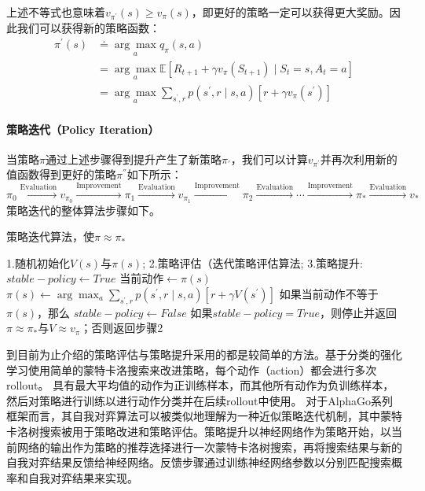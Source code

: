 上述不等式也意味着$v_{\pi^{\prime}}(s) \geq v_{\pi}(s)$，即更好的策略一定可以获得更大奖励。因此我们可以获得新的策略函数：
\begin{equation}
  \begin{aligned}
  \pi^{\prime}(s) & \doteq \underset{a}{\arg \max } q_{\pi}(s, a) \\
  &=\underset{a}{\arg \max } \mathbb{E}\left[R_{t+1}+\gamma v_{\pi}\left(S_{t+1}\right) \mid S_{t}=s, A_{t}=a\right] \\
  &=\underset{a}{\arg \max } \sum_{s^{\prime}, r} p\left(s^{\prime}, r \mid s, a\right)\left[r+\gamma v_{\pi}\left(s^{\prime}\right)\right]
  \end{aligned}
\end{equation}

\paragraph{策略迭代（Policy Iteration）}
当策略$\pi$通过上述步骤得到提升产生了新策略$\pi_{'}$，我们可以计算$v_{\pi^{'}}$并再次利用新的值函数得到更好的策略$\pi^{''}$如下所示：
\begin{equation}
  \pi_{0} \stackrel{\mathrm{Evaluation}}{\longrightarrow} v_{\pi_{0}} \stackrel{\mathrm{Improvement}}{\longrightarrow} \pi_{1} \stackrel{\mathrm{Evaluation}}{\longrightarrow} v_{\pi_{1}} \stackrel{\mathrm{Improvement}}{\longrightarrow} \pi_{2} \stackrel{\mathrm{Evaluation}}{\longrightarrow} \cdots \stackrel{\mathrm{Improvement}}{\longrightarrow} \pi_{*} \stackrel{\mathrm{Evaluation}}{\longrightarrow} v_{*}
\end{equation}
策略迭代的整体算法步骤如下。
\begin{algorithm}[H]
  \caption{策略迭代算法，使$\pi \approx \pi_{*} $}
  \begin{algorithmic}
    \State 1.随机初始化$V(s)$与$\pi(s)$;
    \State 2.策略评估（迭代策略评估算法;
    \State 3.策略提升:
    \State $stable-policy \leftarrow True$
    \State $当前动作\longleftarrow\pi(s)$
    \State $\pi(s) \leftarrow \arg \max _{a} \sum_{s^{\prime}, r} p\left(s^{\prime}, r \mid s, a\right)\left[r+\gamma V\left(s^{\prime}\right)\right]$
    \State 如果当前动作不等于$\pi(s)$，那么 $stable-policy \leftarrow False$
    \EndFor
    \State 如果$stable-policy = True$，则停止并返回$\pi \approx \pi_{*} $与$V\approx v_{\pi} $；否则返回步骤2
  \end{algorithmic}
\end{algorithm}
到目前为止介绍的策略评估与策略提升采用的都是较简单的方法。基于分类的强化学习使用简单的蒙特卡洛搜索来改进策略\cite{RLC}，每个动作（action）都会进行多次rollout。 具有最大平均值的动作为正训练样本，而其他所有动作为负训练样本，然后对策略进行训练以进行动作分类并在后续rollout中使用。
对于AlphaGo系列框架而言，其自我对弈算法可以被类似地理解为一种近似策略迭代机制，其中蒙特卡洛树搜索被用于策略改进和策略评估。策略提升以神经网络作为策略开始，以当前网络的输出作为策略的推荐选择进行一次蒙特卡洛树搜索，再将搜索结果与新的自我对弈结果反馈给神经网络。反馈步骤通过训练神经网络参数以分别匹配搜索概率和自我对弈结果来实现。

